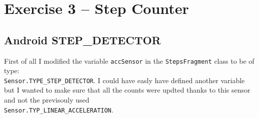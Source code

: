 \section{Exercise 3 – Step Counter}

\subsection{Android STEP\_DETECTOR}

First of all I modified the variable \texttt{accSensor} in the \texttt{StepsFragment} class to be of type:\\ \texttt{Sensor.TYPE\_STEP\_DETECTOR}. I could have easly have defined another variable but I wanted to make sure that all the counts were updted thanks to this sensor and not the previsouly used\\ \texttt{Sensor.TYP\_LINEAR\_ACCELERATION}.


